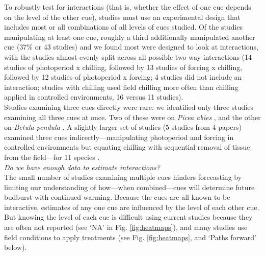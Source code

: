 \documentclass[11pt,letter]{article}
\begin{document}
To robustly test for interactions (that is, whether the effect of one cue depends on the level of the other cue), studies must use an experimental design that includes most or all combinations of all levels of cues studied. Of the studies manipulating at least one cue, roughly a third additionally manipulated another cue (37\% or 43 studies) and we found most were designed to look at interactions, with the studies almost evenly split across all possible two-way interactions (14 studies of photoperiod x chilling, followed by 13 studies of forcing x chilling, followed by 12 studies of photoperiod x forcing; 4 studies did not include an interaction; studies with chilling used field chilling more often than chilling applied in controlled environments, 16 versus 11 studies). \\

Studies examining three cues directly were rare: we identified only three studies examining all three cues at once. Two of these were on \emph{Picea abies} \citep{Worrall:1967aa,Sogaard:2008aa}, and the other on \emph{Betula pendula} \citep{Skuterud:1994aa}. A slightly larger set of studies (5 studies from 4 papers) examined three cues indirectly---manipulating photoperiod and forcing in controlled environments but equating chilling with sequential removal of tissue from the field---for 11 species \citep{Schnabel:1987aa,Heide:1993,Partanen:1998aa,Basler:2014aa}. \\

\emph{Do we have enough data to estimate interactions?}\\
The small number of studies examining multiple cues hinders forecasting by limiting our understanding of how---when combined---cues will determine future budburst with continued warming. Because the cues are all known to be interactive, estimates of any one cue are influenced by the level of each other cue. But knowing the level of each cue is difficult using current studies because they are often not reported (see `NA' in Fig. \ref{fig:heatmaps}), and many studies use field conditions to apply treatments (see Fig. \ref{fig:heatmaps}, and `Paths forward' below).\\
\end{document}
